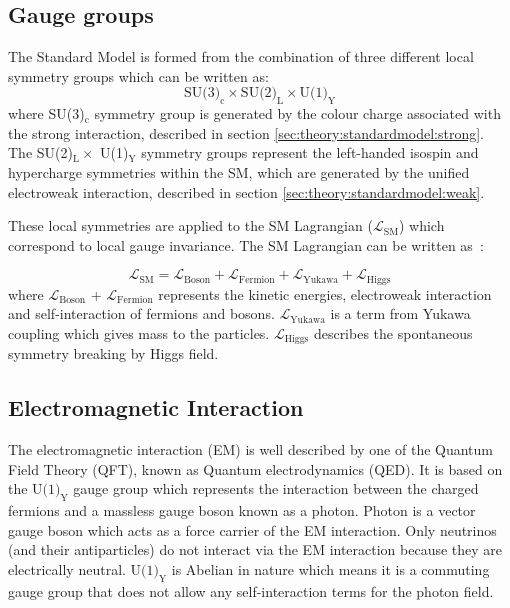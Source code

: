 \subsection{Gauge groups}%
\label{sec:theory:standardmodel:gauge}
The Standard Model is formed from the combination of three different local symmetry groups which can be written as:
\begin{equation}
	\text{SU(3)}_{\text{c}} \times \text{SU(2)}_{\text{L}} \times \text{U(1)}_{\text{Y}}
\end{equation}
where SU(3)$_{\text{c}}$ symmetry group is generated by the colour charge associated with the strong interaction, described in section \ref{sec:theory:standardmodel:strong}. The SU(2)$_{\text{L}} \times$ U(1)$_{\text{Y}}$ symmetry groups represent the left-handed isospin and hypercharge symmetries within the SM, which are generated by the unified electroweak interaction, described in section \ref{sec:theory:standardmodel:weak}. 

These local symmetries are applied to the SM Lagrangian ($\mathcal{L}_{\text{SM}}$) which correspond to local gauge invariance. The SM Lagrangian can be written as~\cite{halzen}:

\begin{equation}
	\mathcal{L}_{\text{SM}} = \mathcal{L}_{\text{Boson}} + \mathcal{L}_{\text{Fermion}} + \mathcal{L}_{\text{Yukawa}} + \mathcal{L}_{\text{Higgs}}
\end{equation}
where $\mathcal{L}_{\text{Boson}}$ + $\mathcal{L}_{\text{Fermion}}$ represents the kinetic energies, electroweak interaction and self-interaction of fermions and bosons. $\mathcal{L}_{\text{Yukawa}}$ is a term from Yukawa coupling which gives mass to the particles. $\mathcal{L}_{\text{Higgs}}$ describes the spontaneous symmetry breaking by Higgs field.

\subsection{Electromagnetic Interaction}%
\label{sec:theory:standardmodel:em}
The electromagnetic interaction (EM) is well described by one of the Quantum Field Theory (QFT), known as Quantum electrodynamics (QED). It is based on the $\text{U(1)}_{\text{Y}}$ gauge group which represents the interaction between the charged fermions and a massless gauge boson known as a photon. Photon is a vector gauge boson which acts as a force carrier of the EM interaction. Only neutrinos (and their antiparticles) do not interact via the EM interaction because they are electrically neutral. $\text{U(1)}_{\text{Y}}$ is Abelian in nature which means it is a commuting gauge group that does not allow any self-interaction terms for the photon field.

